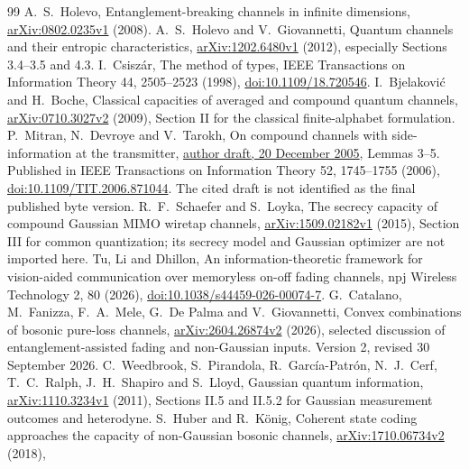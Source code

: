 \documentclass[11pt]{article}
\begin{document}
\begin{thebibliography}{99}
 A.~S.~Holevo, Entanglement-breaking channels in infinite
dimensions, \href{https://arxiv.org/abs/0802.0235v1}{arXiv:0802.0235v1} (2008).
 A.~S.~Holevo and V.~Giovannetti, Quantum channels
and their entropic characteristics,
\href{https://arxiv.org/abs/1202.6480v1}{arXiv:1202.6480v1} (2012),
especially Sections 3.4--3.5 and 4.3.
 I.~Csisz\'ar, The method of types, IEEE Transactions on
Information Theory 44, 2505--2523 (1998),
\href{https://doi.org/10.1109/18.720546}{doi:10.1109/18.720546}.
 I.~Bjelakovi\'c and H.~Boche, Classical capacities of
averaged and compound quantum channels,
\href{https://arxiv.org/abs/0710.3027v2}{arXiv:0710.3027v2} (2009),
Section II for the classical finite-alphabet formulation.
 P.~Mitran, N.~Devroye and V.~Tarokh, On compound
channels with side-information at the transmitter,
\href{https://ece.uwaterloo.ca/~pmitran/compound3.pdf}{author draft,
20 December 2005}, Lemmas 3--5. Published in IEEE Transactions on
Information Theory 52, 1745--1755 (2006),
\href{https://doi.org/10.1109/TIT.2006.871044}{doi:10.1109/TIT.2006.871044}.
The cited draft is not identified as the final published byte version.
 R.~F.~Schaefer and S.~Loyka, The secrecy capacity
of compound Gaussian MIMO wiretap channels,
\href{https://arxiv.org/abs/1509.02182v1}{arXiv:1509.02182v1} (2015),
Section III for common quantization; its secrecy model and Gaussian
optimizer are not imported here.
 Tu, Li and Dhillon, An information-theoretic framework for
vision-aided communication over memoryless on-off fading channels,
npj Wireless Technology 2, 80 (2026),
\href{https://doi.org/10.1038/s44459-026-00074-7}
{doi:10.1038/s44459-026-00074-7}.
 G.~Catalano, M.~Fanizza, F.~A.~Mele,
G.~De Palma and V.~Giovannetti, Convex combinations of bosonic
pure-loss channels,
\href{https://arxiv.org/abs/2604.26874v2}{arXiv:2604.26874v2} (2026),
selected discussion of entanglement-assisted fading and non-Gaussian
inputs. Version 2, revised 30 September 2026.
 C.~Weedbrook, S.~Pirandola,
R.~Garc\'ia-Patr\'on, N.~J.~Cerf, T.~C.~Ralph, J.~H.~Shapiro
and S.~Lloyd, Gaussian quantum information,
\href{https://arxiv.org/abs/1110.3234v1}{arXiv:1110.3234v1} (2011),
Sections II.5 and II.5.2 for Gaussian measurement outcomes and heterodyne.
 S.~Huber and R.~K\"onig, Coherent state coding approaches
the capacity of non-Gaussian bosonic channels,
\href{https://arxiv.org/abs/1710.06734v2}{arXiv:1710.06734v2} (2018),

\end{thebibliography}
\end{document}
